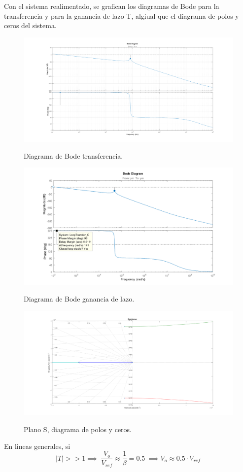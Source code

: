 Con el sistema realimentado, se grafican los diagramas de Bode para la transferencia y para la ganancia de lazo T, algiual que el diagrama de polos y ceros del sistema.
\begin{figure}[H]
	\centering
	\includegraphics[width=0.9\linewidth]{ImagenesParteIII/Bode.png}
	\label{fig:bode}
	\caption{Diagrama de Bode transferencia.}
\end{figure}
\begin{figure}[H]
	\centering
	\includegraphics[width=0.9\linewidth]{ImagenesParteIII/BodeT.png}
	\label{fig:bodeT}
	\caption{Diagrama de Bode ganancia de lazo.}
\end{figure}

\begin{figure}[H]
	\centering
	\includegraphics[width=0.9\linewidth]{ImagenesParteIII/Rlocus.png}
	\label{fig:zplane}
	\caption{Plano S, diagrama de polos y ceros.}
\end{figure}
En lineas generales, si 
\begin{equation}
|T| >> 1 \implies \ \frac{V_o}{V_{ref}} \approx \frac{1}{\beta} =  0.5 \ \implies V_o\approx 0.5 \cdot V_{ref} 
\end{equation}

